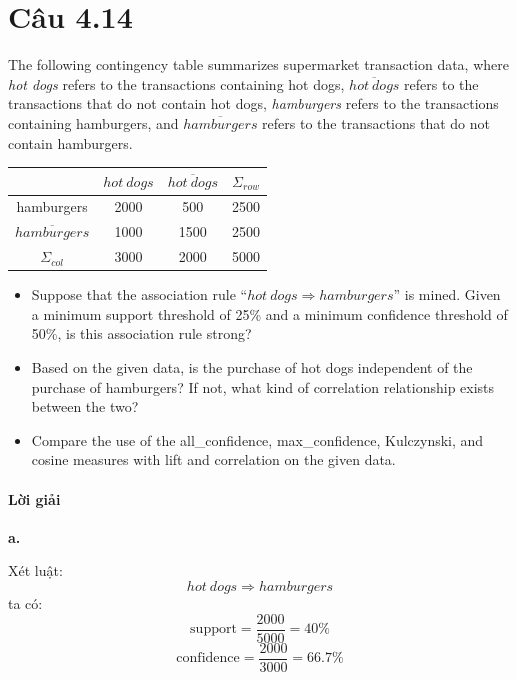 \section{Câu 4.14}
The following contingency table summarizes supermarket transaction data, where \textit{hot dogs} refers to the transactions containing hot dogs, $\overline{hot\ dogs}$ refers to the transactions that do not contain hot dogs, \textit{hamburgers} refers to the transactions containing hamburgers, and $\overline{hamburgers}$ refers to the transactions that do not contain hamburgers.

\begin{center}
    \begin{tabular}{|c|c|c|c|}
        \hline
                                & $hot\ dogs$ & $\overline{hot\ dogs}$ & $\Sigma_{row}$ \\
        \hline
        hamburgers              & 2000        & 500                    & 2500           \\
        $\overline{hamburgers}$ & 1000        & 1500                   & 2500           \\
        \hline
        $\Sigma_{col}$          & 3000        & 2000                   & 5000           \\
        \hline
    \end{tabular}
\end{center}

\begin{itemize}
    \item[a.] Suppose that the association rule ``$hot\ dogs \Rightarrow hamburgers$'' is mined. Given a minimum support threshold of 25\% and a minimum confidence threshold of 50\%, is this association rule strong?
    \item[b.] Based on the given data, is the purchase of hot dogs independent of the purchase of hamburgers? If not, what kind of correlation relationship exists between the two?
    \item[c.] Compare the use of the all\_confidence, max\_confidence, Kulczynski, and cosine measures with lift and correlation on the given data.
\end{itemize}

\paragraph{Lời giải}
\noindent \textbf{a.}

Xét luật:
\[
    hot\ dogs \Rightarrow hamburgers
\]
ta có:
\[
    \mathrm{support}=\frac{2000}{5000}=40\%
\]
\[
    \mathrm{confidence}=\frac{2000}{3000}=66.7\%
\]

